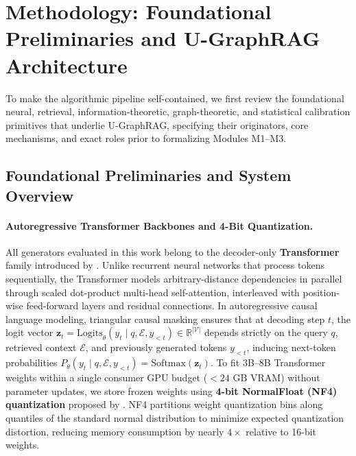 \documentclass[11pt]{article}
\begin{document}
\section{Methodology: Foundational Preliminaries and U-GraphRAG Architecture}

To make the algorithmic pipeline self-contained, we first review the foundational neural, retrieval, information-theoretic, graph-theoretic, and statistical calibration primitives that underlie U-GraphRAG, specifying their originators, core mechanisms, and exact roles prior to formalizing Modules M1--M3.

\subsection{Foundational Preliminaries and System Overview}
\label{sec:preliminaries}

\paragraph{Autoregressive Transformer Backbones and 4-Bit Quantization.}
All generators evaluated in this work belong to the decoder-only \textbf{Transformer} family introduced by \citet{vaswani2017attention}. Unlike recurrent neural networks that process tokens sequentially, the Transformer models arbitrary-distance dependencies in parallel through scaled dot-product multi-head self-attention, interleaved with position-wise feed-forward layers and residual connections. In autoregressive causal language modeling, triangular causal masking ensures that at decoding step $t$, the logit vector $\mathbf{z}_t = \text{Logits}_{\theta}(y_t \mid q, \mathcal{E}, y_{<t}) \in \mathbb{R}^{|\mathcal{V}|}$ depends strictly on the query $q$, retrieved context $\mathcal{E}$, and previously generated tokens $y_{<t}$, inducing next-token probabilities $P_{\theta}(y_t \mid q, \mathcal{E}, y_{<t}) = \mathrm{Softmax}(\mathbf{z}_t)$. To fit 3B--8B Transformer weights within a single consumer GPU budget ($<24\text{ GB}$ VRAM) without parameter updates, we store frozen weights using \textbf{4-bit NormalFloat (NF4) quantization} proposed by \citet{dettmers2023qlora}. NF4 partitions weight quantization bins along quantiles of the standard normal distribution to minimize expected quantization distortion, reducing memory consumption by nearly $4\times$ relative to 16-bit weights.
\end{document}
